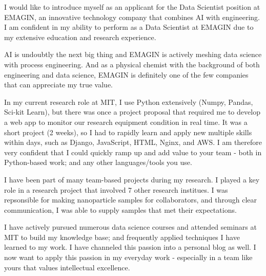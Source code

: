\documentclass[11pt, letterpaper]{awesome-cv}
\begin{document}
\begin{cvletter}



I would like to introduce myself as an applicant for the Data Scientist position
at EMAGIN, an innovative technology company that combines AI with engineering. I
am confident in my ability to perform as a Data Scientist at EMAGIN due to my
extensive education and research experience.



AI is undoubtly the next big thing and EMAGIN is actively meshing data science
with process engineering. And as a physical chemist with the background of both
engineering and data science, EMAGIN is definitely one of the few companies that
can appreciate my true value.


In my current research role at MIT, I use Python extensively (Numpy, Pandas, Sci-kit
Learn), but there was once a project proposal that required me to develop a web
app to monitor our research equipment condition in real time. It was a short
project (2 weeks), so I had to rapidly learn and apply new multiple skills
within days, such as Django, JavaScript, HTML, Nginx, and AWS. I am therefore
very confident that I could quickly ramp up and add value to your team - both in
Python-based work; and any other languages/tools you use.

I have been part of many team-based projects during my research. I played a key
role in a research project that involved 7 other research institues. I was
repsonsible for making nanoparticle samples for collaborators, and through clear
communication, I was able to supply samples that met their expectations.

I have actively pursued numerous data science courses and attended seminars at
MIT to build my knowledge base; and frequently applied techniques I have learned
to my work. I have channeled this passion into a personal blog as well. I now
want to apply this passion in my everyday work - especially in a team like yours
that values intellectual excellence.


\end{cvletter}


\makeletterclosing
\end{document}
